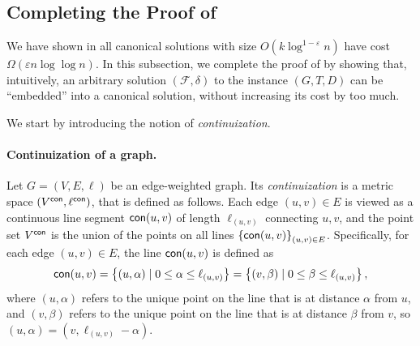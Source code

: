 \documentclass[11pt]{article}
\theoremstyle{definition}
\newcommand{\set}[1]{\left\{ #1 \right\}}
\newcommand{\fset}{{\mathcal{F}}}
\newcommand{\eps}{{\varepsilon}}
\begin{document}
\begin{titlepage}
\newcommand{\dia}{\textsf{diam}}
\newcommand{\girth}{g}
\newcommand{\con}{\textnormal{\textsf{con}}}
\newcommand{\lcon}{\ell^{\con}}
\newcommand{\Vcon}{V^{\con}}
\subsection{Completing the Proof of }
\label{subsec: mapping}

We have shown in  all canonical solutions with size $O(k\log^{1-\eps} n)$ have cost $\Omega(\eps n\log\log n)$. In this subsection, we complete the proof of  by showing that, intuitively, an arbitrary solution $(\fset,\delta)$ to the instance $(G,T,D)$ can be ``embedded'' into a canonical solution, without increasing its cost by too much. 

We start by introducing the notion of \emph{continuization}.

\paragraph{Continuization of a graph.}
Let $G=(V,E,\ell)$ be an edge-weighted graph. Its \emph{continuization} is a metric space $(V^{\con},\ell^{\con})$, that is defined as follows. 
Each edge $(u,v)\in E$ is viewed as a continuous line segment $\con(u,v)$ of length $\ell_{(u,v)}$ connecting $u,v$, and the point set $V^{\con}$ is the union of the points on all lines $\set{\con(u,v)}_{(u,v)\in E}$. 
Specifically, for each edge $(u,v)\in E$, the line $\con(u,v)$ is defined as \[\con(u,v)=\set{(u,\alpha)\mid 0\le \alpha\le \ell_{(u,v)}}=\set{(v,\beta)\mid 0\le \beta\le \ell_{(u,v)}},\]
where $(u,\alpha)$ refers to the unique point on the line that is at distance $\alpha$ from $u$, and $(v,\beta)$ refers to the unique point on the line that is at distance $\beta$ from $v$, so $(u,\alpha)=(v,\ell_{(u,v)}-\alpha)$.


\end{titlepage}
\end{document}
